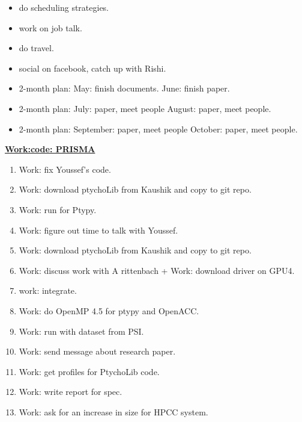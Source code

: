 \begin{minipage}{0.5\textwidth}
\begin{itemize}
\tiny \item \tiny do scheduling strategies.
\item \tiny work on job talk.
\item \tiny do travel.
\item \tiny social on facebook, catch up with Rishi.
\end{itemize}
\begin{itemize}
\item \tiny 2-month plan: May: finish documents.  June:  finish paper.
\item \tiny 2-month plan: July: paper, meet people  August: paper, meet people.
\item \tiny 2-month plan: September: paper, meet people  October:
  paper, meet people.
\end{itemize}
\end{minipage}

\begin{minipage}{\columnwidth}
\underline{\bf \tiny {Work:code: PRISMA}}
\begin{enumerate}
\item \tiny Work: fix Youssef's code.
\item \tiny Work: download ptychoLib from Kaushik and copy to git repo.
\item \tiny Work: run for Ptypy.
\item \tiny Work: figure out time to talk with Youssef.
\item \tiny Work: download ptychoLib from Kaushik and copy to git repo.

\item \tiny Work: discuss work with A rittenbach + Work: download
  driver on GPU4.

\item \tiny work: integrate.
\item \tiny Work: do OpenMP 4.5 for ptypy and OpenACC.
\item \tiny Work: run with dataset from PSI.
\item \tiny Work: send message about research paper.
\item \tiny Work: get profiles for PtychoLib code.
\item \tiny Work: write report for spec.
\item \tiny Work: ask for an increase in size for HPCC system.
\end{enumerate}
\end{minipage}

